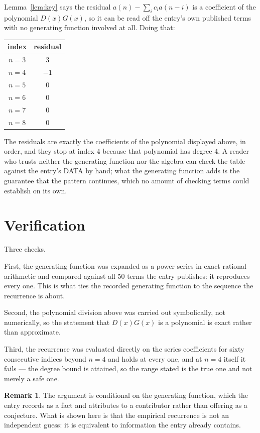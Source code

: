 \documentclass[11pt,a4paper]{article}
\theoremstyle{plain}
\theoremstyle{definition}
\newtheorem{remark}[theorem]{Remark}
\begin{document}
Lemma~\ref{lem:key} says the residual $a(n)-\sum_ic_ia(n-i)$ is a coefficient of the
polynomial $D(x)G(x)$, so it can be read off the entry's own published terms with no
generating function involved at all. Doing that:
\begin{center}
\begin{tabular}{cc}
index & residual \\ \hline
$n=3$ & $3$ \\
$n=4$ & $-1$ \\
$n=5$ & $0$ \\
$n=6$ & $0$ \\
$n=7$ & $0$ \\
$n=8$ & $0$
\end{tabular}
\end{center}
The residuals are exactly the coefficients of the polynomial displayed above, in order, and
they stop at index $4$ because that polynomial has degree $4$. A reader who trusts
neither the generating function nor the algebra can check the table against the entry's DATA
by hand; what the generating function adds is the guarantee that the pattern continues, which
no amount of checking terms could establish on its own.

\section{Verification}

Three checks.

First, the generating function was expanded as a power series in exact rational arithmetic and
compared against all $50$ terms the entry publishes: it reproduces every one. This is
what ties the recorded generating function to the sequence the recurrence is about.

Second, the polynomial division above was carried out symbolically, not numerically, so the
statement that $D(x)G(x)$ is a polynomial is exact rather than approximate.

Third, the recurrence was evaluated directly on the series coefficients for sixty consecutive
indices beyond $n=4$ and holds at every one, and at $n=4$ itself it fails --- the
degree bound is attained, so the range stated is the true one and not merely a safe one.

\begin{remark}
The argument is conditional on the generating function, which the entry records as a fact and
attributes to a contributor rather than offering as a conjecture. What is shown here is that
the empirical recurrence is not an independent guess: it is equivalent to information the
entry already contains.
\end{remark}
\end{document}
